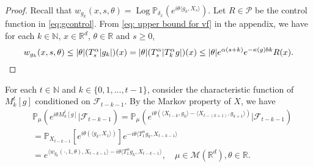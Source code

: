 \documentclass[12pt, a4paper]{amsart}
\theoremstyle{definition}
\numberwithin{equation}{section}
\begin{document}
\begin{proof}
    Recall that $w_{g_k}(x,s,\theta)=\operatorname{Log}\mathbb{P}_{\delta_x}(e^{i\theta \langle g_k, X_s \rangle})$.
    Let $R \in \mathcal P$ be the control function in \eqref{eq:gcontrol}.
    From \eqref{eq: upper bound for vf} in the appendix, we have for each $k \in \mathbb{N}$, $x\in\mathbb{R}^d$, $\theta\in \mathbb{R}$ and $s\geq 0$,
\begin{equation}
    w_{g_k}(x,s,\theta) 
    \leq |\theta| (T_s^\alpha |g_k|) (x) 
    = |\theta| (T_{s}^\alpha |T^\alpha_k g|) (x)
    \leq |\theta| e^{\alpha(s+k)}e^{-\kappa(g)bk}R(x).
    \qedhere
\end{equation}
\end{proof}
    For each $t \in \mathbb N$ and $k \in \{0,1,...,t-1\}$, consider the characteristic function of $M^t_k[g]$ conditioned on $\mathcal{F}_{t-k-1}$.
    By the Markov property of $X$, we have
 \begin{align*}
    &\mathbb{P}_{\mu}(e^{i\theta M_k^t[g]}|\mathcal{F}_{t-k-1}) 
    =\mathbb{P}_{\mu}(e^{i\theta (\langle X_{t-k},g_k\rangle - \langle X_{t-(k+1)},g_{k+1}\rangle)}|\mathcal{F}_{t-k-1}) 
    \\&=\mathbb P_{X_{t-k-1}} [e^{i\theta(\langle g_k,X_1\rangle)}]e^{-i\theta \langle T_1^{\alpha}g_k,X_{t-k-1}\rangle}   
    \\&= e^{\langle w_{g_k}(\cdot,1,\theta),X_{t-k-1}\rangle -i \theta\langle T_1^{\alpha}g_k,X_{t-k-1}\rangle},
    \quad \mu \in \mathcal M(\mathbb R^d), \theta \in \mathbb R.
\end{align*}
\end{document}
